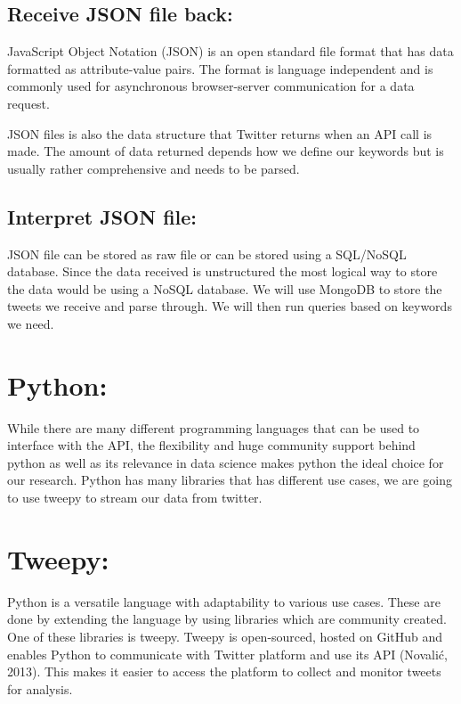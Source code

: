 %

\subsection{Receive JSON file back:}

JavaScript Object Notation (JSON) is an open standard file format that has data formatted as attribute-value pairs. The format is language independent and is commonly used for asynchronous browser-server communication for a data request.

JSON files is also the data structure that Twitter returns when an API call is made. The amount of data returned depends how we define our keywords but is usually rather comprehensive and needs to be parsed.

\subsection{Interpret JSON file:}

JSON file can be stored as raw file or can be stored using a SQL/NoSQL database. Since the data received is unstructured the most logical way to store the data would be using a NoSQL database. We will use MongoDB to store the tweets we receive and parse through. We will then run queries based on keywords we need.

\section{Python:}

While there are many different programming languages that can be used to interface with the API, the flexibility and huge community support behind python as well as its relevance in data science makes python the ideal choice for our research. Python has many libraries that has different use cases, we are going to use tweepy to stream our data from twitter.

\section{Tweepy:}

Python is a versatile language with adaptability to various use cases. These are done by extending the language by using libraries which are community created. One of these libraries is tweepy. Tweepy is open-sourced, hosted on GitHub and enables Python to communicate with Twitter platform and use its API (Novalić, 2013). This makes it easier to access the platform to collect and monitor tweets for analysis.


